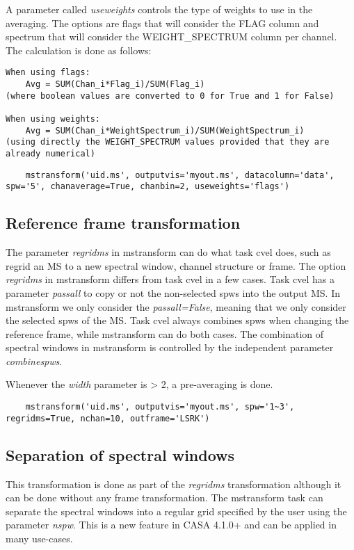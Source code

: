 A parameter called {\it useweights} controls the type of weights to use in the
averaging. The options are flags that will consider the FLAG column and spectrum
that will consider the WEIGHT_SPECTRUM column per channel. The calculation is
done as follows:

\begin{verbatim}
When using flags:
    Avg = SUM(Chan_i*Flag_i)/SUM(Flag_i)     
(where boolean values are converted to 0 for True and 1 for False)

When using weights:
    Avg = SUM(Chan_i*WeightSpectrum_i)/SUM(WeightSpectrum_i)     
(using directly the WEIGHT_SPECTRUM values provided that they are already numerical)

\end{verbatim}

\begin{verbatim}
    mstransform('uid.ms', outputvis='myout.ms', datacolumn='data', spw='5', chanaverage=True, chanbin=2, useweights='flags')
\end{verbatim}

\subsection{Reference frame transformation}
The parameter {\it regridms} in mstransform can do what task cvel does, such as
regrid an MS to a new spectral window, channel structure or frame. The option {\it regridms}
in mstransform differs from task cvel in a few cases. Task cvel has a
parameter {\it passall} to copy or not the non-selected spws into the output MS. In 
mstransform we only consider the {\it passall=False}, meaning that we only consider the
selected spws of the MS. Task cvel always combines spws when changing the reference
frame, while mstransform can do both cases. The combination of spectral windows in mstransform
is controlled by the independent parameter {\it combinespws}.

Whenever the {\it width} parameter is > 2, a pre-averaging is done. 

\begin{verbatim}
    mstransform('uid.ms', outputvis='myout.ms', spw='1~3', regridms=True, nchan=10, outframe='LSRK')
\end{verbatim}

\subsection{Separation of spectral windows}
This transformation is done as part of the {\it regridms} transformation
although it can be done without any frame transformation. The mstransform
task can separate the spectral windows into a regular grid specified by the
user using the parameter {\it nspw}. This is a new feature in CASA
4.1.0+ and can be applied in many use-cases. %

